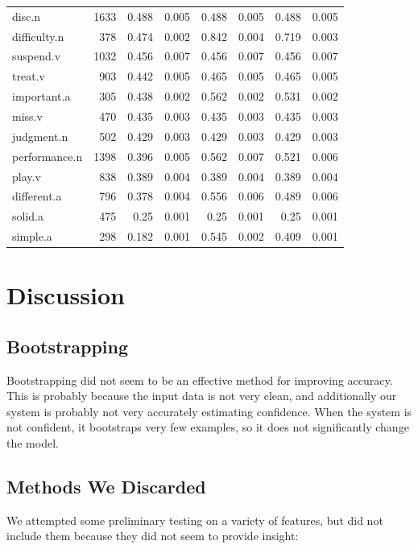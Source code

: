 \documentclass{article}
\begin{document}
\begin{longtable}{l | r r r r r r r}
disc.n	&	1633	&	0.488	&	0.005	&	0.488	&	0.005	&	0.488	&	0.005\\
difficulty.n	&	378	&	0.474	&	0.002	&	0.842	&	0.004	&	0.719	&	0.003\\
suspend.v	&	1032	&	0.456	&	0.007	&	0.456	&	0.007	&	0.456	&	0.007\\
treat.v	&	903	&	0.442	&	0.005	&	0.465	&	0.005	&	0.465	&	0.005\\
important.a	&	305	&	0.438	&	0.002	&	0.562	&	0.002	&	0.531	&	0.002\\
miss.v	&	470	&	0.435	&	0.003	&	0.435	&	0.003	&	0.435	&	0.003\\
judgment.n	&	502	&	0.429	&	0.003	&	0.429	&	0.003	&	0.429	&	0.003\\
performance.n	&	1398	&	0.396	&	0.005	&	0.562	&	0.007	&	0.521	&	0.006\\
play.v	&	838	&	0.389	&	0.004	&	0.389	&	0.004	&	0.389	&	0.004\\
different.a	&	796	&	0.378	&	0.004	&	0.556	&	0.006	&	0.489	&	0.006\\
solid.a	&	475	&	0.25	&	0.001	&	0.25	&	0.001	&	0.25	&	0.001\\
simple.a	&	298	&	0.182	&	0.001	&	0.545	&	0.002	&	0.409	&	0.001\\

\end{longtable}

\section{Discussion}

\subsection{Bootstrapping}

Bootstrapping did not seem to be an effective method for improving accuracy.  This is probably because the input data is not very clean, and additionally our system is probably not very accurately estimating confidence.  When the system is not confident, it bootstraps very few examples, so it does not significantly change the model.

\subsection{Methods We Discarded}

We attempted some preliminary testing on a variety of features, but did not include them because they did not seem to provide insight:
\end{document}
